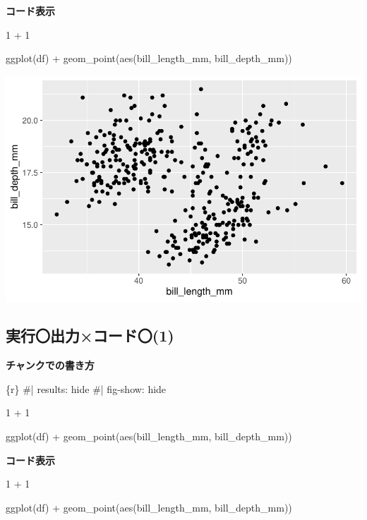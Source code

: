 \documentclass[
  b5paper,
  xelatex, ja=standard]{bxjsbook}
\newenvironment{Shaded}{\begin{snugshade}}{\end{snugshade}}
\newcommand{\DecValTok}[1]{\textcolor[rgb]{0.68,0.00,0.00}{#1}}
\newcommand{\FunctionTok}[1]{\textcolor[rgb]{0.28,0.35,0.67}{#1}}
\newcommand{\InformationTok}[1]{\textcolor[rgb]{0.37,0.37,0.37}{#1}}
\newcommand{\NormalTok}[1]{\textcolor[rgb]{0.00,0.23,0.31}{#1}}
\newcommand{\SpecialCharTok}[1]{\textcolor[rgb]{0.37,0.37,0.37}{#1}}
\begin{document}
\textbf{コード表示}

\begin{Shaded}
\begin{Highlighting}[]
\DecValTok{1} \SpecialCharTok{+} \DecValTok{1}


\FunctionTok{ggplot}\NormalTok{(df) }\SpecialCharTok{+}
  \FunctionTok{geom\_point}\NormalTok{(}\FunctionTok{aes}\NormalTok{(bill\_length\_mm, bill\_depth\_mm))}
\end{Highlighting}
\end{Shaded}

\includegraphics{basic_files/figure-pdf/unnamed-chunk-6-1.pdf}

\subsection{実行〇\textbar 出力×\textbar コード〇(1)}

\textbf{チャンクでの書き方}

\begin{Shaded}
\begin{Highlighting}[]
\InformationTok{\textasciigrave{}\textasciigrave{}\textasciigrave{}\{r\}}
\InformationTok{\#| results: hide}
\InformationTok{\#| fig{-}show: hide}

\InformationTok{1 + 1}


\InformationTok{ggplot(df) +}
\InformationTok{  geom\_point(aes(bill\_length\_mm, bill\_depth\_mm))}
\InformationTok{\textasciigrave{}\textasciigrave{}\textasciigrave{}}
\end{Highlighting}
\end{Shaded}

\textbf{コード表示}

\begin{Shaded}
\begin{Highlighting}[]
\DecValTok{1} \SpecialCharTok{+} \DecValTok{1}


\FunctionTok{ggplot}\NormalTok{(df) }\SpecialCharTok{+}
  \FunctionTok{geom\_point}\NormalTok{(}\FunctionTok{aes}\NormalTok{(bill\_length\_mm, bill\_depth\_mm))}
\end{Highlighting}
\end{Shaded}
\end{document}
